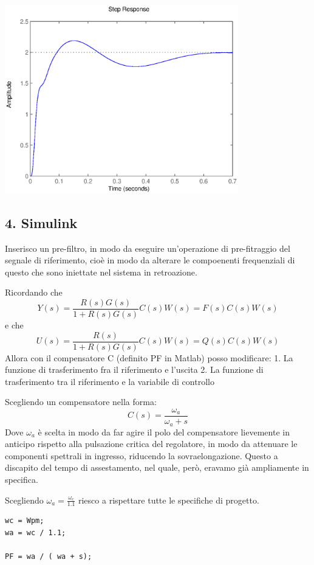 \documentclass{article}
\begin{document}
\includegraphics [width=4in]{prog6RADICI_14.eps}


\subsection*{4. Simulink}

\begin{par}
Inserisco un pre-filtro, in modo da eseguire un'operazione di pre-fitraggio del segnale di riferimento, cioè
in modo da alterare le compoenenti frequenziali di questo che sono iniettate nel sistema in retroazione.

Ricordando che
$$ Y(s) = \frac{R(s)G(s)}{1 + R(s)G(s)}C(s)W(s) = F(s)C(s)W(s) $$
e che
$$ U(s) = \frac{R(s)}{1 + R(s)G(s)}C(s)W(s) = Q(s)C(s)W(s) $$
Allora con il compensatore C (definito PF in Matlab) posso modificare:
1. La funzione di trasferimento fra il riferimento e l'uscita
2. La funzione di trasferimento tra il riferimento e la variabile di controllo

Scegliendo un compensatore nella forma:
$$ C(s) = \frac{\omega_a}{\omega_a  + s} $$
Dove $ \omega_a $ è scelta in modo da far agire il polo del
compensatore lievemente in anticipo rispetto alla pulsazione critica del
regolatore, in modo da attenuare le componenti spettrali in ingresso, riducendo la sovraelongazione.
Questo a discapito del tempo di assestamento, nel quale, però, eravamo già ampliamente in specifica.

Scegliendo $ \omega_a = \frac{\omega_c}{1.1} $
riesco a rispettare tutte le specifiche di progetto.
\end{par}
\begin{verbatim}
wc = Wpm;
wa = wc / 1.1;

PF = wa / ( wa + s);
\end{verbatim}
\end{document}
